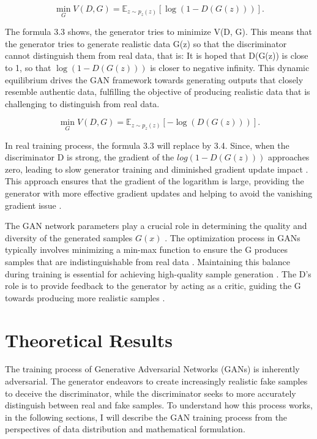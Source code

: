 \begin{equation}
    \min_{G} V(D, G) = \mathbb{E}_{z \sim p_{z}(z)} [\log(1 - D(G(z)))].
\end{equation}


The formula 3.3 shows, the generator tries to minimize V(D, G). 
This means that the generator tries to generate realistic data G(z) so that the discriminator cannot distinguish 
them from real data, that is: It is hoped that D(G(z)) is close to 1, so that $\log (1 - D(G(z)))$ is closer to negative infinity.
This dynamic equilibrium drives the GAN framework towards generating outputs that closely resemble authentic data, 
fulfilling the objective of producing realistic data that is challenging to distinguish from real data.


\begin{equation}
    \min_{G} V(D, G) = \mathbb{E}_{z \sim p_{z}(z)} [-\log(D(G(z)))].
\end{equation}

In real training process, the formula 3.3 will replace by 3.4. Since, when the discriminator D is strong, 
the gradient of the $log(1 - D(G(z)))$ approaches zero, leading to slow generator training and diminished gradient update impact \citep{10.1007/s11263-019-01265-2}.  
This approach ensures that the gradient of the logarithm is large, providing the generator with more effective gradient updates and 
helping to avoid the vanishing gradient issue \citep{10.1109/tpami.2018.2872043}.



The GAN network parameters play a crucial role in determining the quality and diversity of 
the generated samples $G(x)$ \citep{10.1007/s10928-021-09787-4}. The optimization process in GANs 
typically involves minimizing a min-max function to ensure the G produces samples that 
are indistinguishable from real data \citep{10.1109/taslp.2017.2761547}. Maintaining this balance 
during training is essential for achieving high-quality sample generation \citep{10.1007/s10928-021-09787-4}. 
The D's role is to provide feedback to the generator by acting as a critic, 
guiding the G towards producing more realistic samples \citep{10.48550/arxiv.1802.05637}.



\section*{Theoretical Results}

The training process of Generative Adversarial Networks (GANs) is inherently adversarial. 
The generator endeavors to create increasingly realistic fake samples to deceive the discriminator, 
while the discriminator seeks to more accurately distinguish between real and fake samples. 
To understand how this process works, in the following sections, 
I will describe the GAN training process from the perspectives of data distribution and mathematical formulation.


